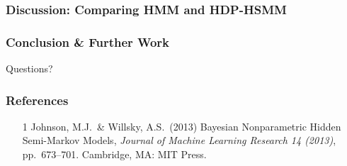 \documentclass{beamer}
\begin{document}
\begin{frame}
	\frametitle{Discussion: Comparing HMM and HDP-HSMM}
\end{frame}

\begin{frame}
	\frametitle{Conclusion \& Further Work}
\end{frame}

\begin{frame}
	\centering
	\huge{Questions?}
\end{frame}


\begin{frame}
    \frametitle{References}
    \begin{itemize}
        \item [1] Johnson, M.J.\ \& Willsky, A.S.\ (2013) Bayesian Nonparametric Hidden Semi-Markov Models, {\it Journal of Machine Learning Research 14 (2013)},
        pp.\ 673--701. Cambridge, MA: MIT Press.
    \end{itemize}
\end{frame}
\end{document}
